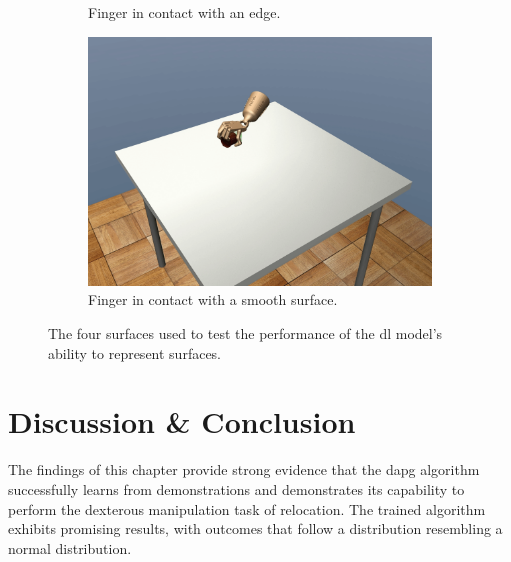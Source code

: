 \begin{figure}[!h]
\begin{subfigure}[b]{0.32\textwidth}
		\caption{Finger in contact with an edge.}
		\label{fig:ai-frame-2}
	\end{subfigure}
	\hfill
	\begin{subfigure}[b]{0.32\textwidth}
		\centering
		\includegraphics[width=\textwidth]{chapters/3-in-hand-manipulation/fig/frame_44.png}
		\caption{Finger in contact with a smooth surface.}
		\label{fig:ai-frame-3}
	\end{subfigure}
		\caption{The four surfaces used to test the performance of the \gls{dl} model's ability to represent surfaces.}
		\label{fig:ai-frames}
\end{figure}

\newpage
\section{Discussion \& Conclusion}


The findings of this chapter provide strong evidence that the \gls{dapg} algorithm successfully learns from demonstrations and demonstrates its capability to perform the dexterous manipulation task of relocation. The trained algorithm exhibits promising results, with outcomes that follow a distribution resembling a normal distribution.\medskip

